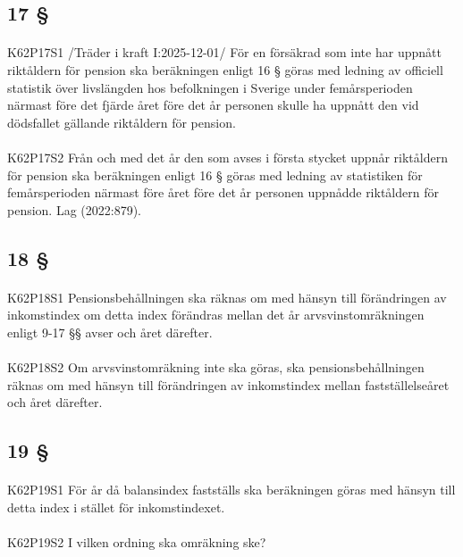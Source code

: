 \documentclass[a4paper,notitlepage,openany,10pt]{book}
\begin{document}
\subsection*{17 §}
\paragraph*{}
{\tiny K62P17S1}
/Träder i kraft I:2025-12-01/
För en försäkrad som inte har uppnått riktåldern för pension ska beräkningen enligt 16 § göras med ledning av officiell statistik över livslängden hos befolkningen i Sverige under femårsperioden närmast före det fjärde året före det år personen skulle ha uppnått den vid dödsfallet gällande riktåldern för pension.
\paragraph*{}
{\tiny K62P17S2}
Från och med det år den som avses i första stycket uppnår riktåldern för pension ska beräkningen enligt 16 § göras med ledning av statistiken för femårsperioden närmast före året före det år personen uppnådde riktåldern för pension.
Lag (2022:879).
\subsection*{18 §}
\paragraph*{}
{\tiny K62P18S1}
Pensionsbehållningen ska räknas om med hänsyn till förändringen av inkomstindex om detta index förändras mellan det år arvsvinstomräkningen enligt 9-17 §§ avser och året därefter.
\paragraph*{}
{\tiny K62P18S2}
Om arvsvinstomräkning inte ska göras, ska pensionsbehållningen räknas om med hänsyn till förändringen av inkomstindex mellan fastställelseåret och året därefter.
\subsection*{19 §}
\paragraph*{}
{\tiny K62P19S1}
För år då balansindex fastställs ska beräkningen göras med hänsyn till detta index i stället för inkomstindexet.
\paragraph*{}
{\tiny K62P19S2}
I vilken ordning ska omräkning ske?
\end{document}
